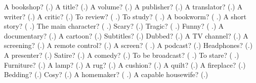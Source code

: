 \begin{tcolorbox}[breakable,colback=teal!4,colframe=teal!35!black,title={Before you move on}]
A bookshop? (\textbf{}.) A title? (\textbf{}.) A volume? (\textbf{}.) A publisher? (\textbf{}.) A translator? (\textbf{}.) A writer? (\textbf{}.) A critic? (\textbf{}.) To review? (\textbf{ }.) To study? (\textbf{ }.) A bookworm? (\textbf{ }.) A short story? (\textbf{ }.) The main character? (\textbf{ }.) Scary? (\textbf{}.) Tragic? (\textbf{ }.) Funny? (\textbf{ }.) A documentary? (\textbf{}.) A cartoon? (\textbf{}.) Subtitles? (\textbf{}.) Dubbed? (\textbf{}.) A TV channel? (\textbf{}.) A screening? (\textbf{}.) A remote control? (\textbf{}.) A screen? (\textbf{ }.) A podcast? (\textbf{}.) Headphones? (\textbf{}.) A presenter? (\textbf{}.) Satire? (\textbf{}.) A comedy? (\textbf{}.) To be broadcast? (\textbf{ }.) To stare? (\textbf{ }.) Furniture? (\textbf{}.) A lamp? (\textbf{}.) A rug? (\textbf{}.) A cushion? (\textbf{}.) A quilt? (\textbf{}.) A fireplace? (\textbf{}.) Bedding? (\textbf{}.) Cosy? (\textbf{}.) A homemaker? (\textbf{ }.) A capable housewife? (\textbf{}.)
\end{tcolorbox}
